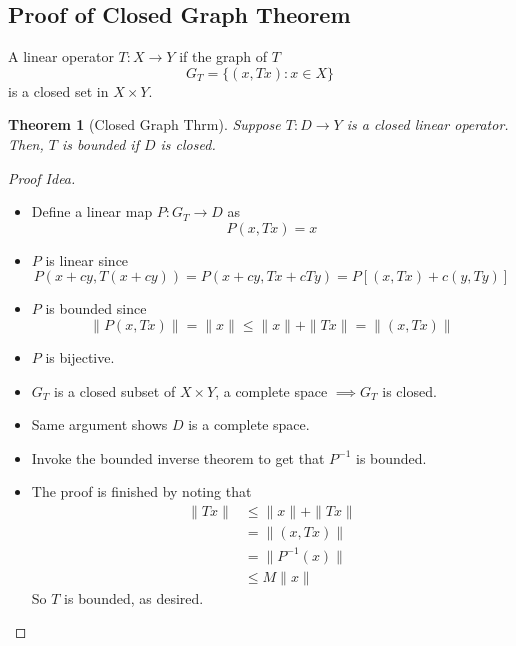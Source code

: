 \documentclass{article}
\theoremstyle{plain}
\newtheorem{thrm}{Theorem}
\theoremstyle{definition}
\begin{document}
		\subsection{Proof of Closed Graph Theorem}
		A linear operator $T: X\to Y$ if the graph of $T$ 
		\begin{equation*}
				G_T = \{(x, Tx) : x\in X\}
		\end{equation*}
		is a closed set in $X\times Y$. 
		\begin{thrm}[Closed Graph Thrm]
				Suppose $T: D\to Y$ is a closed linear operator. Then, $T$ is bounded if $D$ is closed. 
		\end{thrm}
		\begin{proof}[Proof Idea]
				\begin{itemize}
						\item Define a linear map $P: G_T \to D$ as 
								\begin{equation*}
										P(x, Tx) = x
								\end{equation*}
						\item $P$ is linear since 
								\begin{equation*}
										P(x+cy, T(x+cy)) = P(x+cy, Tx+cTy) = P[(x, Tx) + c(y, Ty)] 
								\end{equation*}
						\item $P$ is bounded since 
								\begin{equation*}
										\|P(x, Tx)\| = \|x\| \leq \|x\| + \|Tx\| = \|(x, Tx)\|
								\end{equation*}
						\item $P$ is bijective. 
						\item $G_T$ is a closed subset of $X\times Y$, a complete space $\implies G_T$ is closed. 
						\item Same argument shows $D$ is a complete space. 
						\item Invoke the bounded inverse theorem to get that $P^{-1}$ is bounded. 
						\item The proof is finished by noting that 
								\begin{align*}
										\|Tx\| &\leq \|x\| + \|Tx\| \\ 
													 &= \|(x, Tx)\| \\ 
													 &= \|P^{-1}(x)\| \\ 
													 &\leq M\|x\|
								\end{align*}
								So $T$ is bounded, as desired. 
				\end{itemize}
		\end{proof}
\end{document}
